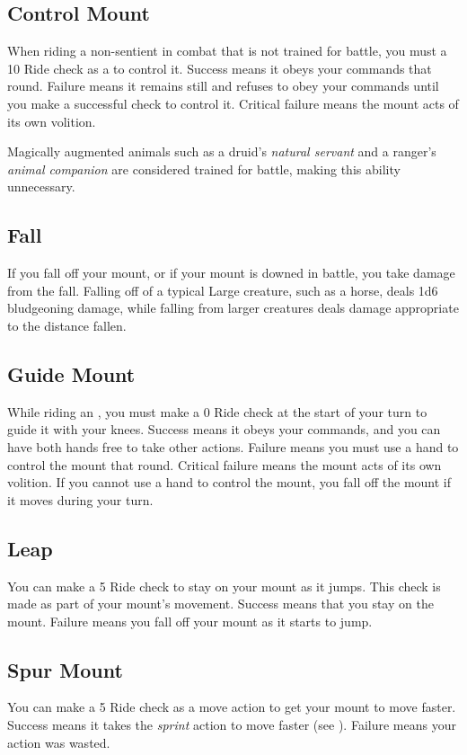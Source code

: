     \subsection{Control Mount}
        When riding a non-sentient  in combat that is not trained for battle, you must a  10 Ride check as a  to control it. Success means it obeys your commands that round. Failure means it remains still and refuses to obey your commands until you make a successful check to control it. Critical failure means the mount acts of its own volition.

        Magically augmented animals such as a druid's \textit{natural servant} and a ranger's \textit{animal companion} are considered trained for battle, making this ability unnecessary.

    \subsection{Fall}
        If you fall off your mount, or if your mount is downed in battle, you take damage from the fall.
        Falling off of a typical Large creature, such as a horse, deals 1d6 bludgeoning damage, while falling from larger creatures deals damage appropriate to the distance fallen.

    \subsection{Guide Mount}
        While riding an , you must make a  0 Ride check at the start of your turn to guide it with your knees. Success means it obeys your commands, and you can have both hands free to take other actions. Failure means you must use a hand to control the mount that round. Critical failure means the mount acts of its own volition. If you cannot use a hand to control the mount, you fall off the mount if it moves during your turn.

    \subsection{Leap}
        You can make a  5 Ride check to stay on your mount as it jumps. This check is made as part of your mount's movement. Success means that you stay on the mount. Failure means you fall off your mount as it starts to jump.

    \subsection{Spur Mount}
        You can make a  5 Ride check as a move action to get your mount to move faster. Success means it takes the \textit{sprint} action to move faster (see ).
        Failure means your action was wasted.

